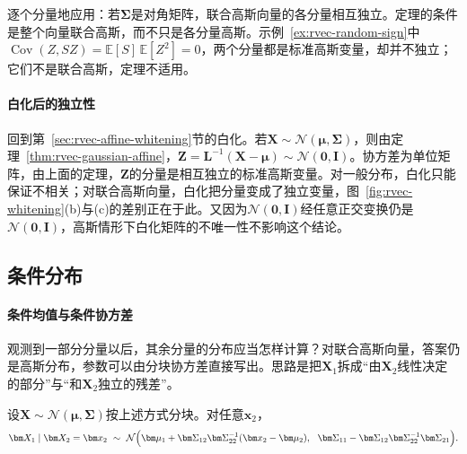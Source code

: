 逐个分量地应用：若$\bm\Sigma$是对角矩阵，联合高斯向量的各分量相互独立。定理的条件是整个向量联合高斯，而不只是各分量高斯。示例~\ref{ex:rvec-random-sign}中$\operatorname{Cov}(Z,SZ)=\mathbb E[S]\,\mathbb E[Z^2]=0$，两个分量都是标准高斯变量，却并不独立；它们不是联合高斯，定理不适用。

\paragraph{白化后的独立性}
回到第~\ref{sec:rvec-affine-whitening}节的白化。若$\bm X\sim\mathcal N(\bm\mu,\bm\Sigma)$，则由定理~\ref{thm:rvec-gaussian-affine}，$\bm Z=\bm L^{-1}(\bm X-\bm\mu)\sim\mathcal N(\bm0,\bm I)$。协方差为单位矩阵，由上面的定理，$\bm Z$的分量是相互独立的标准高斯变量。对一般分布，白化只能保证不相关；对联合高斯向量，白化把分量变成了独立变量，图~\ref{fig:rvec-whitening}(b)与(c)的差别正在于此。又因为$\mathcal N(\bm0,\bm I)$经任意正交变换仍是$\mathcal N(\bm0,\bm I)$，高斯情形下白化矩阵的不唯一性不影响这个结论。

\subsection{条件分布}
\label{sec:rvec-gaussian-conditioning}

\paragraph{条件均值与条件协方差}
观测到一部分分量以后，其余分量的分布应当怎样计算？对联合高斯向量，答案仍是高斯分布，参数可以由分块协方差直接写出。思路是把$\bm X_1$拆成“由$\bm X_2$线性决定的部分”与“和$\bm X_2$独立的残差”。

\begin{theorem}[高斯条件分布]
\label{thm:rvec-gaussian-conditional}
设$\bm X\sim\mathcal N(\bm\mu,\bm\Sigma)$按上述方式分块。对任意$\bm x_2$，
\begin{equation}
 \bm X_1\mid\bm X_2=\bm x_2\ \sim\ \mathcal N\Bigl(\bm\mu_1+\bm\Sigma_{12}\bm\Sigma_{22}^{-1}(\bm x_2-\bm\mu_2),\ \ \bm\Sigma_{11}-\bm\Sigma_{12}\bm\Sigma_{22}^{-1}\bm\Sigma_{21}\Bigr).
 \label{eq:rvec-gaussian-conditional}
\end{equation}
\end{theorem}

